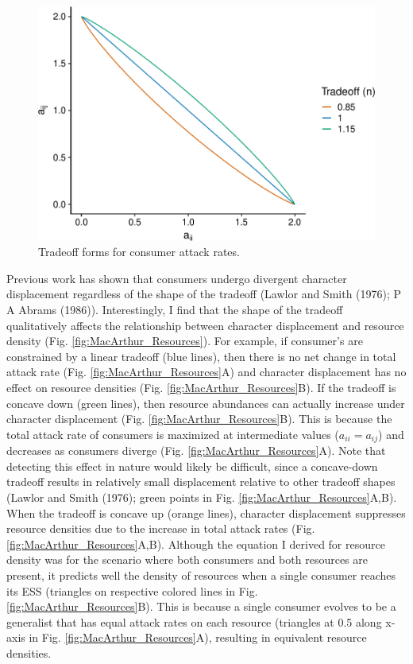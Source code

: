 \documentclass[11pt,]{article}
\begin{document}
\begin{figure}
\centering
\includegraphics{ECD_Supp_Mat_files/figure-latex/Tradeoff-1.pdf}
\caption{\label{fig:Tradeoff}Tradeoff forms for consumer attack rates.}
\end{figure}

Previous work has shown that consumers undergo divergent character
displacement regardless of the shape of the tradeoff (Lawlor and Smith
(1976); P A Abrams (1986)). Interestingly, I find that the shape of the
tradeoff qualitatively affects the relationship between character
displacement and resource density (Fig. \ref{fig:MacArthur_Resources}).
For example, if consumer's are constrained by a linear tradeoff (blue
lines), then there is no net change in total attack rate (Fig.
\ref{fig:MacArthur_Resources}A) and character displacement has no effect
on resource densities (Fig. \ref{fig:MacArthur_Resources}B). If the
tradeoff is concave down (green lines), then resource abundances can
actually increase under character displacement (Fig.
\ref{fig:MacArthur_Resources}B). This is because the total attack rate
of consumers is maximized at intermediate values (\(a_{ii}=a_{ij}\)) and
decreases as consumers diverge (Fig. \ref{fig:MacArthur_Resources}A).
Note that detecting this effect in nature would likely be difficult,
since a concave-down tradeoff results in relatively small displacement
relative to other tradeoff shapes (Lawlor and Smith (1976); green points
in Fig. \ref{fig:MacArthur_Resources}A,B). When the tradeoff is concave
up (orange lines), character displacement suppresses resource densities
due to the increase in total attack rates (Fig.
\ref{fig:MacArthur_Resources}A,B). Although the equation I derived for
resource density was for the scenario where both consumers and both
resources are present, it predicts well the density of resources when a
single consumer reaches its ESS (triangles on respective colored lines
in Fig. \ref{fig:MacArthur_Resources}B). This is because a single
consumer evolves to be a generalist that has equal attack rates on each
resource (triangles at 0.5 along x-axis in Fig.
\ref{fig:MacArthur_Resources}A), resulting in equivalent resource
densities.
\end{document}
